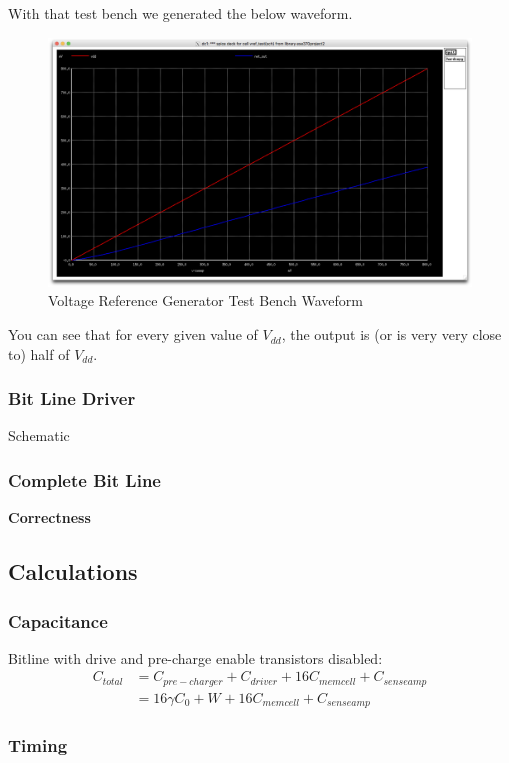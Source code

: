 \documentclass[a4paper]{article}
\begin{document}
With that test bench we generated the below waveform.\\

\begin{figure}[H]
	\centering
	\includegraphics[scale=0.1]{vRefTestWave}
	\caption{Voltage Reference Generator Test Bench Waveform}
	\label{fig:vRefTestWave}
\end{figure}

You can see that for every given value of $V_{dd}$, the output is (or is very very close to) half of $V_{dd}$.

\subsubsection{Bit Line Driver}
Schematic
\subsubsection{Complete Bit Line}
\textbf{Correctness}

\subsection{Calculations}
\subsubsection{Capacitance}
Bitline with drive and pre-charge enable transistors disabled:
\begin{align*}
C_{total} &= C_{pre-charger} + C_{driver} + 16 C_{memcell} + C_{senseamp}\\
&= 16 \gamma C_0 + W_{} + 16 C_{memcell} + C_{senseamp}
\end{align*}

\subsubsection{Timing}
\end{document}
